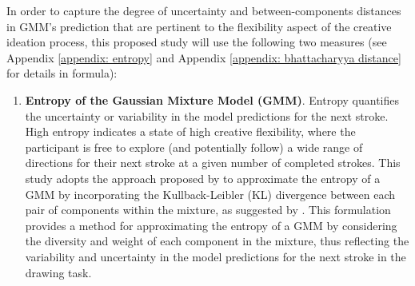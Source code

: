 \documentclass[../Proposal.tex]{subfiles}
\begin{document}
In order to capture the degree of uncertainty and between-components distances in GMM's prediction that are pertinent to the flexibility aspect of the creative ideation process, this proposed study will use the following two measures (see Appendix \ref{appendix: entropy} and Appendix \ref{appendix: bhattacharyya distance} for details in formula): 
\begin{enumerate}
    \item \textbf{Entropy of the Gaussian Mixture Model (GMM)}. Entropy quantifies the uncertainty or variability in the model predictions for the next stroke. High entropy indicates a state of high creative flexibility, where the participant is free to explore (and potentially follow) a wide range of directions for their next stroke at a given number of completed strokes. This study adopts the approach proposed by \textcite{huber_entropy_2008} to approximate the entropy of a GMM by incorporating the Kullback-Leibler (KL) divergence between each pair of components within the mixture, as suggested by \textcite{hershey_approximating_2007}. This formulation provides a method for approximating the entropy of a GMM by considering the diversity and weight of each component in the mixture, thus reflecting the variability and uncertainty in the model predictions for the next stroke in the drawing task.

\end{enumerate}
\end{document}
